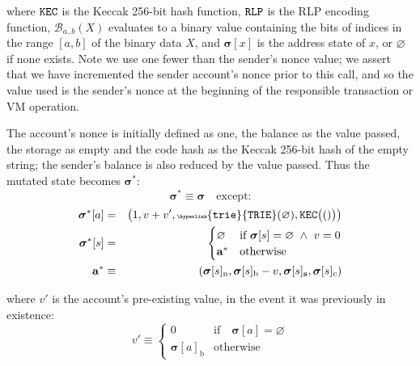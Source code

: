 \documentclass[9pt,oneside]{amsart}
\begin{document}
\begin{multicols}{2}
where $\mathtt{\tiny KEC}$ is the Keccak 256-bit hash function, $\mathtt{\tiny RLP}$ is the RLP encoding function, $\mathcal{B}_{a..b}(X)$ evaluates to a binary value containing the bits of indices in the range $[a, b]$ of the binary data $X$, and $\boldsymbol{\sigma}[x]$ is the address state of $x$, or $\varnothing$ if none exists. Note we use one fewer than the sender's nonce value; we assert that we have incremented the sender account's nonce prior to this call, and so the value used is the sender's nonce at the beginning of the responsible transaction or VM operation.

The account's nonce is initially defined as one, the balance as the value passed, the storage as empty and the code hash as the Keccak 256-bit hash of the empty string; the sender's balance is also reduced by the value passed. Thus the mutated state becomes $\boldsymbol{\sigma}^*$:
\begin{equation}
\boldsymbol{\sigma}^* \equiv \boldsymbol{\sigma} \quad \text{except:}
\end{equation}
\begin{eqnarray}
\boldsymbol{\sigma}^*[a] &=& \big( 1, v + v', \mathtt{\tiny \hyperlink{trie}{TRIE}}(\varnothing), \mathtt{\tiny KEC}\big(()\big) \big) \\
\boldsymbol{\sigma}^*[s] &=& \begin{cases}
\varnothing & \text{if}\ \boldsymbol{\sigma}[s] = \varnothing \ \wedge\ v = 0 \\
\mathbf{a}^* & \text{otherwise}
\end{cases} \\
\mathbf{a}^* &\equiv& (\boldsymbol{\sigma}[s]_{\mathrm{n}}, \boldsymbol{\sigma}[s]_{\mathrm{b}} - v, \boldsymbol{\sigma}[s]_{\mathbf{s}}, \boldsymbol{\sigma}[s]_{\mathrm{c}})
\end{eqnarray}

where $v'$ is the account's pre-existing value, in the event it was previously in existence:
\begin{equation}
v' \equiv \begin{cases}
0 & \text{if} \quad \boldsymbol{\sigma}[a] = \varnothing\\
\boldsymbol{\sigma}[a]_{\mathrm{b}} & \text{otherwise}
\end{cases}
\end{equation}



\end{multicols}
\end{document}
